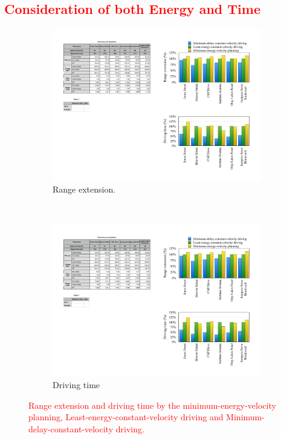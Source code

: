 \documentclass{IEEEtran}
\begin{document}
\textcolor{red}{\subsection{Consideration of both Energy and Time}} \label{subsec:energy_time}




\begin{figure}   %
\centering
	\begin{subfigure}{0.42\textwidth}
	\includegraphics[width=\hsize]{Figures/range_comp_bar.pdf}
	\caption{Range extension.}
	\label{fig:range_comp}
	\end{subfigure}
~
	\begin{subfigure}{0.42\textwidth}
	\includegraphics[width=\hsize]{Figures/driving_time_comp_bar.pdf}
	\caption{Driving time}
	\label{fig:driving_time_comp.}
	\end{subfigure}
\caption{\textcolor{red}{Range extension and driving time by the minimum-energy-velocity planning, Least-energy-constant-velocity driving and Minimum-delay-constant-velocity driving.}}
\label{fig:min_energy_planning_comp}
\end{figure}
\end{document}
